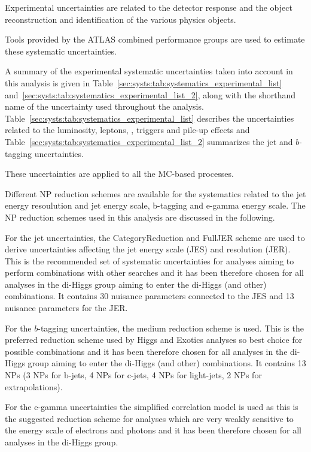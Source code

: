Experimental uncertainties are related to the detector response and the object reconstruction and identification of the various physics objects. 

Tools provided by the ATLAS combined performance groups are used to estimate these systematic uncertainties. 

A summary of the experimental systematic uncertainties taken into account in this analysis is given in Table~\ref{sec:systs:tab:systematics_experimental_list} and~\ref{sec:systs:tab:systematics_experimental_list_2}, along with the shorthand name of the uncertainty used throughout the analysis. Table~\ref{sec:systs:tab:systematics_experimental_list} describes the uncertainties related to the luminosity, leptons, \MET, triggers and pile-up effects and Table~\ref{sec:systs:tab:systematics_experimental_list_2} summarizes the jet and $b$-tagging uncertainties. 

These uncertainties are applied to all the MC-based processes. 

Different NP reduction schemes are available for the systematics related to the jet energy resoulution and jet energy scale, b-tagging and e-gamma energy scale.  The NP reduction schemes used in this analysis are discussed in the following.

For the jet uncertainties, the CategoryReduction and FullJER scheme are used to derive uncertainties affecting the jet energy scale (JES) and resolution (JER). This is the recommended set of systematic uncertainties for analyses aiming to perform combinations with other searches and it has been therefore chosen for all analyses in the di-Higgs group aiming to enter the di-Higgs (and other) combinations. It contains 30 nuisance parameters connected to the JES and 13 nuisance parameters for the JER. 

For the $b$-tagging uncertainties, the medium reduction scheme is used. This is the preferred reduction scheme used by Higgs and Exotics analyses so best choice for possible combinations and it has been therefore chosen for all analyses in the di-Higgs group aiming to enter the di-Higgs (and other) combinations. It contains 13 NPs (3 NPs for b-jets, 4 NPs for c-jets, 4 NPs for light-jets, 2 NPs for extrapolations).

For the e-gamma uncertainties the simplified correlation model is used as this is the suggested reduction scheme for analyses which are very weakly sensitive to the energy scale of electrons and photons and it has been therefore chosen for all analyses in the di-Higgs group.



